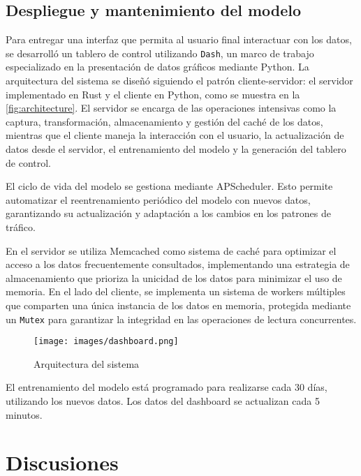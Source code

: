 \documentclass[12pt]{article}
\begin{document}

\subsection{Despliegue y mantenimiento del modelo}

Para entregar una interfaz que permita al usuario final interactuar con los datos, se desarrolló un tablero de control utilizando \texttt{Dash}, un marco de trabajo especializado en la presentación de datos gráficos mediante Python. La arquitectura del sistema se diseñó siguiendo el patrón cliente-servidor: el servidor implementado en Rust y el cliente en Python, como se muestra en la \autoref{fig:architecture}. El servidor se encarga de las operaciones intensivas como la captura, transformación, almacenamiento y gestión del caché de los datos, mientras que el cliente maneja la interacción con el usuario, la actualización de datos desde el servidor, el entrenamiento del modelo y la generación del tablero de control.

El ciclo de vida del modelo se gestiona mediante APScheduler. Esto permite automatizar el reentrenamiento periódico del modelo con nuevos datos, garantizando su actualización y adaptación a los cambios en los patrones de tráfico.

En el servidor se utiliza Memcached como sistema de caché para optimizar el acceso a los datos frecuentemente consultados, implementando una estrategia de almacenamiento que prioriza la unicidad de los datos para minimizar el uso de memoria. En el lado del cliente, se implementa un sistema de workers múltiples que comparten una única instancia de los datos en memoria, protegida mediante un \texttt{Mutex} para garantizar la integridad en las operaciones de lectura concurrentes.

\begin{figure}[H]
    \centering
    \texttt{[image: images/dashboard.png]}
    \caption{Arquitectura del sistema}
    \label{fig:architecture}
\end{figure}

El entrenamiento del modelo está programado para realizarse cada 30 días, utilizando los nuevos datos. Los datos del dashboard se actualizan cada 5 minutos.

\section{Discusiones}
\end{document}
